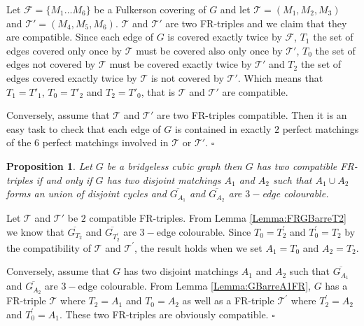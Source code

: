 \documentclass{amsart}
\newtheorem{prop}[thm]{Proposition}
\theoremstyle{definition}
\theoremstyle{remark}
\newenvironment{prf}{{\bf \noindent Proof } }{\hfill$\square$\\}
\begin{document}
\begin{prf}
Let $\mathcal F=\{M_{1} \ldots M_{6}\}$ be a Fulkerson covering of
$G$ and let $\mathcal T=(M_{1}, M_{2},M_{3})$ and $\mathcal
T'=(M_{4}, M_{5},M_{6})$. $\mathcal T$ and $\mathcal T'$ are two
FR-triples and we claim that they are compatible. Since each edge of
$G$  is covered exactly twice by $\mathcal F$, $T_{1}$ the set of
edges covered only once by $\mathcal T$ must be covered also only
once by $\mathcal T'$, $T_{0}$ the set of edges not covered by
$\mathcal T$ must be covered exactly twice by $\mathcal T'$ and
$T_{2}$ the set of edges covered exactly twice by $\mathcal T$ is
not covered by $\mathcal T'$. Which means that $T_{1}=T'_{1}$,
$T_{0}=T'_{2}$ and $T_{2}=T'_{0}$, that is $\mathcal T$ and
$\mathcal T'$ are compatible.


Conversely, assume that $\mathcal T$ and $\mathcal T'$ are two
FR-triples compatible. Then it is an easy task to check that each
edge of $G$ is contained in exactly $2$ perfect matchings of the $6$
perfect matchings involved in $\mathcal T$ or $\mathcal T'$.
\end{prf}

\begin{prop}\label{Proposition:EquivalenceFRTripleFulkerson}
Let $G$ be a bridgeless cubic graph then $G$ has two compatible
FR-triples if and only if $G$ has  two disjoint matchings $A_{1}$
and $A_{2}$ such that $A_{1} \cup A_{2}$ forms an union of disjoint cycles and $\overline{G_{A_{1}}}$ and
$\overline{G_{A_{2}}}$ are $3-$edge colourable.
\end{prop}
\begin{prf}
Let $\mathcal T$ and $\mathcal T'$ be $2$ compatible FR-triples.
From Lemma \ref{Lemma:FRGBarreT2} we know that
$\overline{G_{T_{2}}}$ and $\overline{G_{T^{'}_{2}}}$ are $3-$edge
colourable. Since $T_{0}=T^{'}_{2}$ and $T^{'}_{0}=T_{2}$ by the
compatibility of $\mathcal T$ and $\mathcal T^{'}$, the result holds
when we set $A_{1}=T_{0}$ and $A_{2}=T_{2}$.


Conversely, assume that $G$ has  two disjoint matchings $A_{1}$ and
$A_{2}$ such that $\overline{G_{A_{1}}}$ and $\overline{G_{A_{2}}}$
are $3-$edge colourable. From Lemma \ref{Lemma:GBarreA1FR}, $G$ has
a FR-triple $\mathcal T$ where $T_{2}=A_{1}$ and $T_{0}=A_{2}$ as
well as a FR-triple $\mathcal T^{'}$ where $T^{'}_{2}=A_{2}$ and
$T^{'}_{0}=A_{1}$. These two FR-triples are obviously compatible.
\end{prf}
\end{document}
